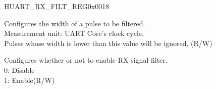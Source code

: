 \begin{register}{H}{UART\_RX\_FILT\_REG}{0x0018}\label{regdesc:UARTRXFILTREG}
%
%
%
\regnewline%
\begin{regdesc}\begin{reglist}
\label{fielddesc:UARTGLITCHFILT}\item [UART\_GLITCH\_FILT] Configures the width of a pulse to be filtered.\\Measurement unit: UART Core's clock cycle.\\Pulses whose width is lower than this value will be ignored. (R/W)
\label{fielddesc:UARTGLITCHFILTEN}\item [UART\_GLITCH\_FILT\_EN] Configures whether or not to enable RX signal filter.\\
0: Disable\\
1: Enable(R/W)
\end{reglist}\end{regdesc}
\end{register}


